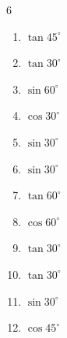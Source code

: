 \begin{multicols}{6}
\begin{enumerate}

  \item $\displaystyle \tan{45^\circ}$

        \phantom{$\displaystyle =1$}

  \item $\displaystyle \tan{30^\circ}$


  \item $\displaystyle \sin{60^\circ}$


  \item $\displaystyle \cos{30^\circ}$


  \item $\displaystyle \sin{30^\circ}$


\columnbreak %

  \item $\displaystyle \sin{30^\circ}$


  \item $\displaystyle \tan{60^\circ}$


  \item $\displaystyle \cos{60^\circ}$


  \item $\displaystyle \tan{30^\circ}$


  \item $\displaystyle \tan{30^\circ}$


  \item $\displaystyle \sin{30^\circ}$


  \item $\displaystyle \cos{45^\circ}$



\end{enumerate}
\end{multicols}
